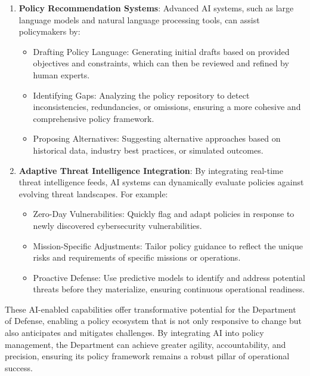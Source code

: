 \documentclass[11pt]{article}
\begin{document}
\begin{enumerate}
		\item \textbf{Policy Recommendation Systems}:
		Advanced AI systems, such as large language models and natural language processing tools, can assist policymakers by:
		\begin{itemize}
			\item Drafting Policy Language: Generating initial drafts based on provided objectives and constraints, which can then be reviewed and refined by human experts.
			\item Identifying Gaps: Analyzing the policy repository to detect inconsistencies, redundancies, or omissions, ensuring a more cohesive and comprehensive policy framework.
			\item Proposing Alternatives: Suggesting alternative approaches based on historical data, industry best practices, or simulated outcomes.
		\end{itemize}

		\item \textbf{Adaptive Threat Intelligence Integration}:
		By integrating real-time threat intelligence feeds, AI systems can dynamically evaluate policies against evolving threat landscapes. For example:
		\begin{itemize}
			\item Zero-Day Vulnerabilities: Quickly flag and adapt policies in response to newly discovered cybersecurity vulnerabilities.
			\item Mission-Specific Adjustments: Tailor policy guidance to reflect the unique risks and requirements of specific missions or operations.
			\item Proactive Defense: Use predictive models to identify and address potential threats before they materialize, ensuring continuous operational readiness.
		\end{itemize}
	\end{enumerate}

	These AI-enabled capabilities offer transformative potential for the Department of Defense, enabling a policy ecosystem that is not only responsive to change but also anticipates and mitigates challenges. By integrating AI into policy management, the Department can achieve greater agility, accountability, and precision, ensuring its policy framework remains a robust pillar of operational success.
\end{document}
